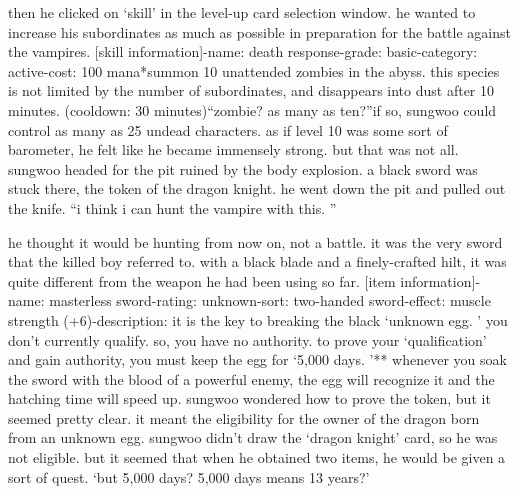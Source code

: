 then he clicked on ‘skill’ in the level-up card selection window.
 he wanted to increase his subordinates as much as possible in preparation for the battle against the vampires.
[skill information]-name: death response-grade: basic-category: active-cost: 100 mana*summon 10 unattended zombies in the abyss.
 this species is not limited by the number of subordinates, and disappears into dust after 10 minutes.
 (cooldown: 30 minutes)“zombie? as many as ten?”if so, sungwoo could control as many as 25 undead characters.
 as if level 10 was some sort of barometer, he felt like he became immensely strong.
 but that was not all.
sungwoo headed for the pit ruined by the body explosion.
 a black sword was stuck there, the token of the dragon knight.
 he went down the pit and pulled out the knife.
“i think i can hunt the vampire with this.
”

he thought it would be hunting from now on, not a battle.
it was the very sword that the killed boy referred to.
with a black blade and a finely-crafted hilt, it was quite different from the weapon he had been using so far.
[item information]-name: masterless sword-rating: unknown-sort: two-handed sword-effect: muscle strength (+6)-description: it is the key to breaking the black ‘unknown egg.
’ you don’t currently qualify.
 so, you have no authority.
to prove your ‘qualification’ and gain authority, you must keep the egg for ‘5,000 days.
’** whenever you soak the sword with the blood of a powerful enemy, the egg will recognize it and the hatching time will speed up.
sungwoo wondered how to prove the token, but it seemed pretty clear.
 it meant the eligibility for the owner of the dragon born from an unknown egg.
sungwoo didn’t draw the ‘dragon knight’ card, so he was not eligible.
but it seemed that when he obtained two items, he would be given a sort of quest.
‘but 5,000 days? 5,000 days means 13 years?’ 

 